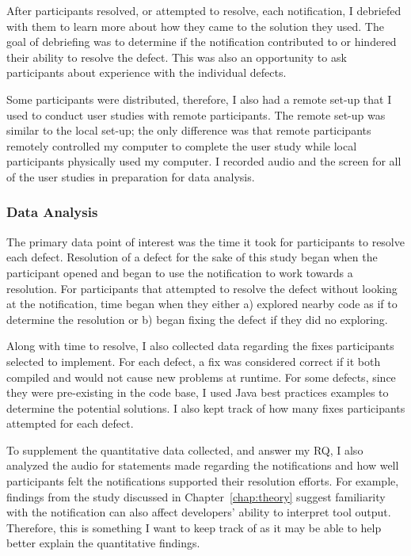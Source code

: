 After participants resolved, or attempted to resolve, each notification, I debriefed with them to learn more about how they came to the solution they used. The goal of debriefing was to determine if the notification contributed to or hindered their ability to resolve the defect. This was also an opportunity to ask participants about experience with the individual defects. 

Some participants were distributed, therefore, I also had a remote set-up that I used to conduct user studies with remote participants. The remote set-up was similar to the local set-up; the only difference was that remote participants remotely controlled my computer to complete the user study while local participants physically used my computer. I recorded audio and the screen for all of the user studies in preparation for data analysis.


\subsubsection{Data Analysis}

The primary data point of interest was the time it took for participants to resolve each defect. 
Resolution of a defect for the sake of this study began when the participant opened and began to use the notification to work towards a resolution. For participants that attempted to resolve the defect without looking at the notification, time began when they either a) explored nearby code as if to determine the resolution or b) began fixing the defect if they did no exploring.

Along with time to resolve, I also collected data regarding the fixes participants selected to implement. For each defect, a fix was considered correct if it both compiled and would not cause new problems at runtime. For some defects, since they were pre-existing in the code base, I used Java best practices examples to determine the potential solutions. I also kept track of how many fixes participants attempted for each defect.

To supplement the quantitative data collected, and answer my RQ, I also analyzed the audio for statements made regarding the notifications and how well participants felt the notifications supported their resolution efforts.
For example, findings from the study discussed in Chapter~\ref{chap:theory} suggest familiarity with the notification can also affect developers' ability to interpret tool output. Therefore, this is something I want to keep track of as it may be able to help better explain the quantitative findings.

